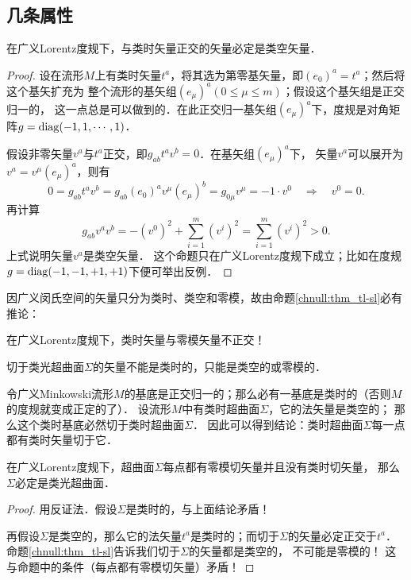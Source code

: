 \subsection{几条属性}
\begin{proposition}\label{chnull:thm_tl-sl}
    在广义Lorentz度规下，与类时矢量正交的矢量必定是类空矢量．
\end{proposition}
\begin{proof}
    设在流形$M$上有类时矢量$t^a$，将其选为第零基矢量，即$(e_0)^a=t^a$；然后将这个基矢扩充为
    整个流形的基矢组$(e_\mu)^a(0\leqslant \mu \leqslant m)$；假设这个基矢组是正交归一的，
    这一点总是可以做到的．在此正交归一基矢组$(e_\mu)^a$下，度规是对角矩阵$g={\rm diag}(-1,1,\cdots,1)$．
    
    假设非零矢量$v^a$与$t^a$正交，即$g_{ab}t^a v^b=0$．在基矢组$(e_\mu)^a$下，
    矢量$v^a$可以展开为$v^a=v^\mu (e_\mu)^a$，则有
    \begin{equation}
        0=g_{ab}t^a v^b=g_{ab}(e_0)^a  v^\mu (e_\mu)^b= g_{0\mu}v^\mu =-1\cdot v^0
        {\quad \Rightarrow \quad  } v^0 = 0.
    \end{equation}
    再计算
    \begin{equation}
        g_{ab}v^a v^b = -(v^0)^2 + \sum_{i=1}^{m} (v^i)^2 =\sum_{i=1}^{m} (v^i)^2 >0.
    \end{equation}
    上式说明矢量$v^a$是类空矢量．
    这个命题只在广义Lorentz度规下成立；比如在度规$g={\rm diag}(-1,-1,+1,+1)$下便可举出反例．
\end{proof}



因广义闵氏空间的矢量只分为类时、类空和零模，故由命题\ref{chnull:thm_tl-sl}必有推论：
\begin{corollary}\label{chnull:thm_n-s}
    在广义Lorentz度规下，类时矢量与零模矢量不正交！
\end{corollary}

\begin{corollary}\label{chnull:thm_n-t}
    切于类光超曲面$\Sigma$的矢量不能是类时的，只能是类空的或零模的．
\end{corollary}

令广义Minkowski流形$M$的基底是正交归一的；那么必有一基底是类时的（否则$M$的度规就变成正定的了）．
设流形$M$中有类时超曲面$\Sigma$，它的法矢量是类空的；
那么这个类时基底必然切于类时超曲面$\Sigma$．
因此可以得到结论：类时超曲面$\Sigma$每一点都有类时矢量切于它．


\begin{proposition}\label{chnull:thm_null-tn}
    在广义Lorentz度规下，超曲面$\Sigma$每点都有零模切矢量并且没有类时切矢量，
    那么$\Sigma$必定是类光超曲面．
\end{proposition}
\begin{proof}
    用反证法．假设$\Sigma$是类时的，与上面结论矛盾！
    
    再假设$\Sigma$是类空的，那么它的法矢量$t^a$是类时的；而切于$\Sigma$的矢量必定正交于$t^a$．
    命题\ref{chnull:thm_tl-sl}告诉我们切于$\Sigma$的矢量都是类空的，
    不可能是零模的！
    这与命题中的条件（每点都有零模切矢量）矛盾！
\end{proof}


